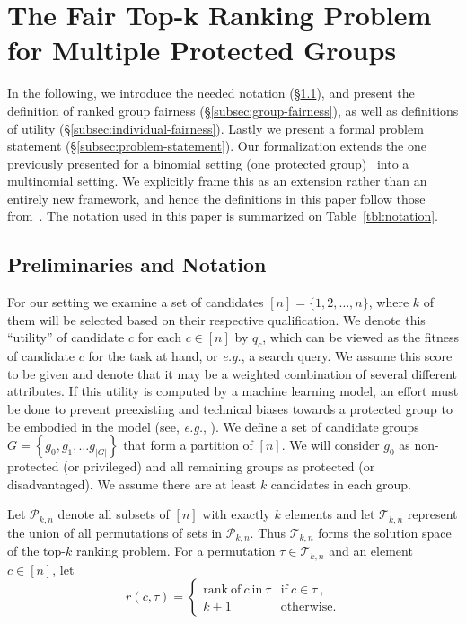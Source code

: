 
\section{The Fair Top-k Ranking Problem for Multiple Protected Groups}\label{sec:problem}

In the following, we introduce the needed notation (\S\ref{subsec:preliminaries}), and present the definition of ranked group fairness (\S\ref{subsec:group-fairness}), as well as definitions of utility (\S\ref{subsec:individual-fairness}). Lastly we present a formal problem statement (\S\ref{subsec:problem-statement}).
%
Our formalization extends the one previously presented for a binomial setting (one protected group)~\cite{zehlike2017fair} into a multinomial setting.
%
We explicitly frame this as an extension rather than an entirely new framework, and hence the definitions in this paper follow those from~\cite{zehlike2017fair}.
%
The notation used in this paper is summarized on Table~\ref{tbl:notation}.

\subsection{Preliminaries and Notation}
\label{subsec:preliminaries}
For our setting we examine a set of candidates $[n] = \{ 1, 2, \dots, n \}$, where $k$ of them will be selected based on their respective qualification. We denote this ``utility'' of candidate $c$ for each $c \in [n]$ by $q_c$, which can be viewed as the fitness of candidate $c$ for the task at hand, or {\it e.g.}, a search query. We assume this score to be given and denote that it may be a weighted combination of several different attributes.
%
If this utility is computed by a machine learning model, an effort must be done to prevent preexisting and technical biases towards a protected group to be embodied in the model (see, {\it e.g.}, \cite{Sweeney2013}).
%
We define a set of candidate groups $G = \left\{g_0, g_1, \ldots g_{|G|}\right\}$ that form a partition of $[n]$. We will consider $g_0$ as non-protected (or privileged) and all remaining groups as protected (or disadvantaged).
%
We assume there are at least $k$ candidates in each group. %

Let ${\mathcal P}_{k,n}$ denote all subsets of $[n]$ with exactly $k$ elements and let ${\mathcal T}_{k,n}$ represent the union of all permutations of sets in ${\mathcal P}_{k,n}$.
%
Thus ${\mathcal T}_{k,n}$ forms the solution space of the top-$k$ ranking problem.
%
For a permutation $\tau \in {\mathcal T}_{k,n}$ and an element $c \in [n]$, let
\[
r(c, \tau) = \begin{cases}
\mathrm{rank~of~} c \mathrm{~in~} \tau & \mathrm{if~} c \in \tau~, \\
k + 1 & \mathrm{otherwise}.
\end{cases}
\]

